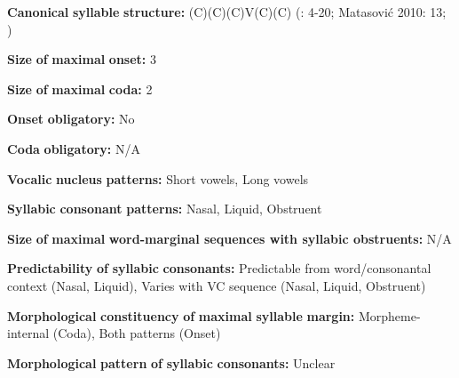 \documentclass[output=paper]{langsci/langscibook}
\begin{document}
\begin{styleBody}
\textbf{Canonical} \textbf{syllable} \textbf{structure:} (C)(C)(C)V(C)(C) (\citealt{Colarusso2006}: 4-20; Matasović 2010: 13; \citealt{Applebaum2013})
\end{styleBody}

\begin{styleBody}
\textbf{Size} \textbf{of} \textbf{maximal} \textbf{onset:} 3
\end{styleBody}

\begin{styleBody}
\textbf{Size} \textbf{of} \textbf{maximal} \textbf{coda:} 2
\end{styleBody}

\begin{styleBody}
\textbf{Onset} \textbf{obligatory:} No
\end{styleBody}

\begin{styleBody}
\textbf{Coda} \textbf{obligatory:} N/A
\end{styleBody}

\begin{styleBody}
\textbf{Vocalic} \textbf{nucleus} \textbf{patterns:} Short vowels, Long vowels
\end{styleBody}

\begin{styleBody}
\textbf{Syllabic} \textbf{consonant} \textbf{patterns:} Nasal, Liquid, Obstruent
\end{styleBody}

\begin{styleBody}
\textbf{Size} \textbf{of} \textbf{maximal} \textbf{word{}-marginal sequences with syllabic obstruents:} N/A
\end{styleBody}

\begin{styleBody}
\textbf{Predictability} \textbf{of} \textbf{syllabic} \textbf{consonants:} Predictable from word/consonantal context (Nasal, Liquid), Varies with VC sequence (Nasal, Liquid, Obstruent)
\end{styleBody}

\begin{styleBody}
\textbf{Morphological} \textbf{constituency} \textbf{of} \textbf{maximal} \textbf{syllable} \textbf{margin:} Morpheme-internal (Coda), Both patterns (Onset)
\end{styleBody}

\begin{styleBody}
\textbf{Morphological} \textbf{pattern} \textbf{of} \textbf{syllabic} \textbf{consonants:} Unclear
\end{styleBody}
\end{document}
